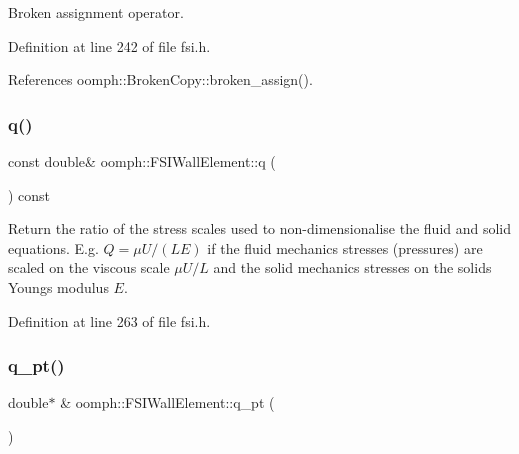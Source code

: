 Broken assignment operator. 



Definition at line 242 of file fsi.\+h.



References oomph\+::\+Broken\+Copy\+::broken\+\_\+assign().

\mbox{\label{classoomph_1_1FSIWallElement_abfc3907362f9cd1a852631f87cbff7aa}} 
\subsubsection{\texorpdfstring{q()}{q()}}
{\footnotesize\ttfamily const double\& oomph\+::\+F\+S\+I\+Wall\+Element\+::q (\begin{DoxyParamCaption}{ }\end{DoxyParamCaption}) const\hspace{0.3cm}{\ttfamily [inline]}}



Return the ratio of the stress scales used to non-\/dimensionalise the fluid and solid equations. E.\+g. $ Q = \mu U/(LE) $ if the fluid mechanics stresses (pressures) are scaled on the viscous scale $ \mu U / L$ and the solid mechanics stresses on the solid\textquotesingle{}s Young\textquotesingle{}s modulus $ E $. 



Definition at line 263 of file fsi.\+h.

\mbox{\label{classoomph_1_1FSIWallElement_ab407513775b5250b016ab91fa98dc1a0}} 
\subsubsection{\texorpdfstring{q\+\_\+pt()}{q\_pt()}}
{\footnotesize\ttfamily double$\ast$ \& oomph\+::\+F\+S\+I\+Wall\+Element\+::q\+\_\+pt (\begin{DoxyParamCaption}{ }\end{DoxyParamCaption})\hspace{0.3cm}{\ttfamily [inline]}}



